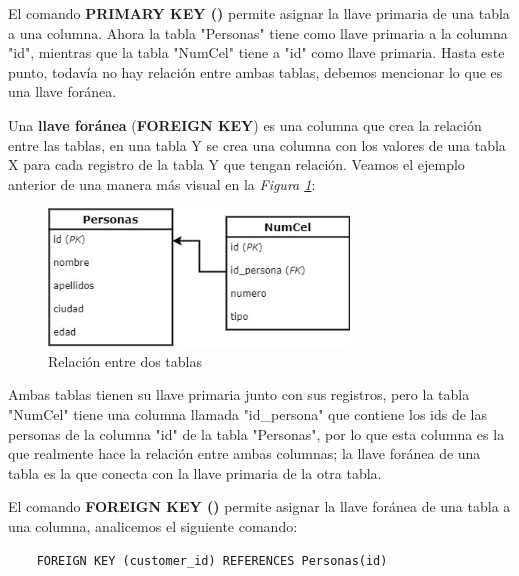 El comando \textbf{PRIMARY KEY ()} permite asignar la llave primaria de una tabla a una columna. Ahora la tabla "Personas" tiene como llave primaria a la columna "id", mientras que la tabla "NumCel" tiene a "id" como llave primaria. Hasta este punto, todavía no hay relación entre ambas tablas, debemos mencionar lo que es una llave foránea.

Una \textbf{llave foránea} (\textbf{FOREIGN KEY}) es una columna que crea la relación entre las tablas, en una tabla Y se crea una columna con los valores de una tabla X para cada registro de la tabla Y que tengan relación. Veamos el ejemplo anterior de una manera más visual en la \textit{Figura \ref{fig: 1}}:
\begin{figure}[H]
    \centering
    \caption{Relación entre dos tablas}
    \label{fig: 1}
    \includegraphics[width=8cm]{ss/relacion_tablas.jpg}
\end{figure}

Ambas tablas tienen su llave primaria junto con sus registros, pero la tabla "NumCel" tiene una columna llamada "id\_persona" que contiene los ids de las personas de la columna "id" de la tabla "Personas", por lo que esta columna es la que realmente hace la relación entre ambas columnas; la llave foránea de una tabla es la que conecta con la llave primaria de la otra tabla.

El comando \textbf{FOREIGN KEY ()} permite asignar la llave foránea de una tabla a una columna, analicemos el siguiente comando:
\begin{lstlisting}
    FOREIGN KEY (customer_id) REFERENCES Personas(id)
\end{lstlisting}

